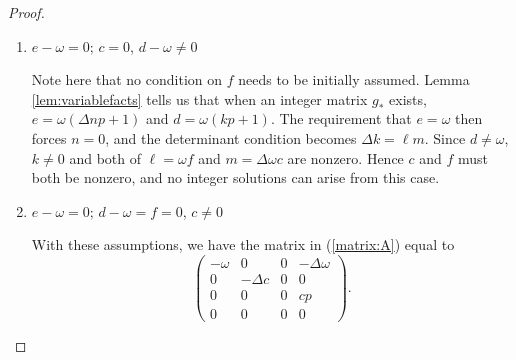 \documentclass{amsart}     %
\theoremstyle{definition}
\begin{document}
\begin{proof}
\begin{enumerate}
This matrix row reduces to a matrix $N$ where $n_{1, 1} = n_{2, 3} = n_{3, 4} = 1$ and all other entries are 0. Then the null space of this matrix consists of vectors of the form $(0,u,0,0)^T$, where $u \in \mathbb Q$. Then the integral vectors $(k,\ell,m,n)^T$ of this result in the matrix
%
\[ g_* = \omega\begin{pmatrix}  1 & \ell & 0 &0 \\
0 &  \Delta & 0 & 0 \\ 
0 & 0 &  1 & 0 \\ 
0 & 0 & -\Delta \ell & \Delta \end{pmatrix}.\]

Here, the determinant condition is satisfied, and we find $g_* \textbf{v}$ to be  $(a',x',b',y')^T = \omega (a + \ell x, \Delta x, b, \Delta (y - \ell b))^T$. Using these new definitions for $a', x', b',$ and $y'$, we find that $c = 0$, $d - \omega  = 0$, and $e - \omega  = 0$  are all satisfied. Further $f = \omega \ell$, so the condition that $f \neq 0 $ is equivalent to requiring $\ell \neq 0$. Because $c = 0$ and $|d| = 1$, the inequality $|cp | \leq 2|d| $ always holds. Then we have the examples $(a',x',b',y')^T = \omega (a + \ell x, \Delta x, b, \Delta (y - \ell b))^T$ for some nonzero integer $\ell$  listed in part (\ref{list:pb}) of the theorem. 

\item\label{case:violet} $e - \omega = 0; \, c = 0$, $d - \omega  \neq 0$

Note here that no condition on $f$ needs to be initially assumed. Lemma \ref{lem:variablefacts} tells us that when an integer matrix $g_*$ exists, $e = \omega(\Delta np + 1)$ and $d = \omega (kp+1)$. The requirement that $e = \omega$ then forces $n = 0$, and the determinant condition becomes $\Delta k = \ell m$. Since $d\neq \omega$, $k\neq 0$ and both of $\ell = \omega f$ and $m = \Delta \omega c$ are nonzero. Hence $c$ and $f$ must both be nonzero, and no integer solutions can arise from this case.



\item\label{case:lavender} $e - \omega = 0; \, d - \omega  =  f = 0$, $c \neq 0$

With these assumptions, we have the matrix in (\ref{matrix:A}) equal to
\[ \begin{pmatrix} -\omega  & 0 & 0 &  -\Delta \omega  \\
 0& -\Delta c & 0 & 0\\ 
0& 0 & 0  & cp \\ 
0 & 0 & 0 &  0\end{pmatrix}.\]


\end{enumerate}
\end{proof}
\end{document}
